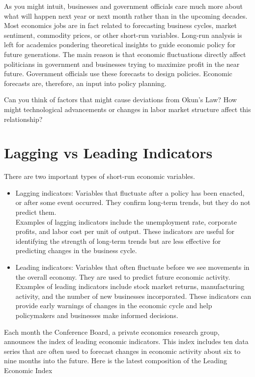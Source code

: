 \documentclass[10pt]{article}
\begin{document}
As you might intuit, businesses and government officials care much more about what will happen next year or next month rather than in the upcoming decades. Most economics jobs are in fact related to forecasting business cycles, market sentiment, commodity prices, or other short-run variables. Long-run analysis is left for academics pondering theoretical insights to guide economic policy for future generations. The main reason is that economic fluctuations directly affect politicians in government and businesses trying to maximize profit in the near future. Government officials use these forecasts to design policies. Economic forecasts are, therefore, an input into policy planning.

Can you think of factors that might cause deviations from Okun's Law? How might technological advancements or changes in labor market structure affect this relationship?

\section*{Lagging vs Leading Indicators}
There are two important types of short-run economic variables.

\begin{itemize}
  \item Lagging indicators: Variables that fluctuate after a policy has been enacted, or after some event occurred. They confirm long-term trends, but they do not predict them.\\
Examples of lagging indicators include the unemployment rate, corporate profits, and labor cost per unit of output. These indicators are useful for identifying the strength of long-term trends but are less effective for predicting changes in the business cycle.
  \item Leading indicators: Variables that often fluctuate before we see movements in the overall economy. They are used to predict future economic activity. Examples of leading indicators include stock market returns, manufacturing activity, and the number of new businesses incorporated. These indicators can provide early warnings of changes in the economic cycle and help policymakers and businesses make informed decisions.
\end{itemize}

Each month the Conference Board, a private economics research group, announces the index of leading economic indicators. This index includes ten data series that are often used to forecast changes in economic activity about six to nine months into the future. Here is the latest composition of the Leading Economic Index
\end{document}
